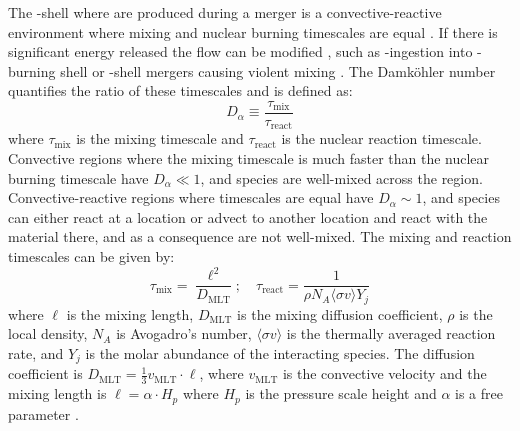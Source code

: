 The \oxygen[]-shell where \pnucn{} are produced during a merger is a convective-reactive environment where mixing and nuclear burning timescales are equal \citep{ritterConvectivereactiveNucleosynthesisSc2018,yadavLargescaleMixingViolent2020a}.  
If there is significant energy released the flow can be modified \citep{dimotakisTurbulentMixing2005}, such as \hydrogen[]-ingestion into \helium[]-burning shell \citep{herwigCONVECTIVEREACTIVEPROTON2011,herwigGLOBALNONSPHERICALOSCILLATIONS2014} or \oxygen[]-\carbon[] shell mergers causing violent mixing \citep{andrassy3DHydrodynamicSimulations2020,yadavLargescaleMixingViolent2020a}.  
The Damköhler number \citep{dimotakisTurbulentMixing2005} quantifies the ratio of these timescales and is defined as:  
\begin{equation}  
    D_\alpha \equiv \frac{\tau_{\mathrm{mix}}}{\tau_{\mathrm{react}}}  
\end{equation}  
where $\tau_{\mathrm{mix}}$ is the mixing timescale and $\tau_{\mathrm{react}}$ is the nuclear reaction timescale.  
Convective regions where the mixing timescale is much faster than the nuclear burning timescale have $D_\alpha \ll 1$, and species are well-mixed across the region.  
Convective-reactive regions where timescales are equal have $D_\alpha \sim 1$, and species can either react at a location or advect to another location and react with the material there, and as a consequence are not well-mixed.  
The mixing and reaction timescales can be given by:  
\begin{equation}  
    \tau_{\mathrm{mix}} = \frac{\ell^2}{D_{\mathrm{MLT}}}; \quad  \tau_{\mathrm{react}} = \frac{1}{\rho N_A \langle \sigma v \rangle Y_j}  
\end{equation}  
where $\ell$ is the mixing length, $D_{\mathrm{MLT}}$ is the mixing diffusion coefficient, $\rho$ is the local density, $N_A$ is Avogadro's number, $\langle \sigma v \rangle$ is the thermally averaged reaction rate, and $Y_j$ is the molar abundance of the interacting species.  
The diffusion coefficient is $D_{\mathrm{MLT}} = \frac{1}{3} v_{\mathrm{MLT}}\cdot\ell$, where $v_{\mathrm{MLT}}$ is the convective velocity and the mixing length is $\ell= \alpha \cdot H_p$ where $H_p$ is the pressure scale height and $\alpha$ is a free parameter \citep{joyceReviewMixingLength2023}.

